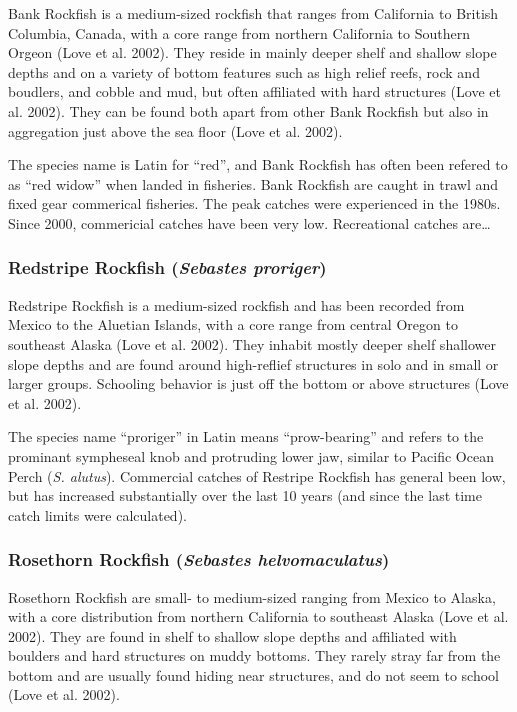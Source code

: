 \documentclass[
  letterpaper,
]{article}
\begin{document}
Bank Rockfish is a medium-sized rockfish that ranges from California to
British Columbia, Canada, with a core range from northern California to
Southern Orgeon (Love et al. 2002). They reside in mainly deeper shelf
and shallow slope depths and on a variety of bottom features such as
high relief reefs, rock and boudlers, and cobble and mud, but often
affiliated with hard structures (Love et al. 2002). They can be found
both apart from other Bank Rockfish but also in aggregation just above
the sea floor (Love et al. 2002).

The species name is Latin for ``red'', and Bank Rockfish has often been
refered to as ``red widow'' when landed in fisheries. Bank Rockfish are
caught in trawl and fixed gear commerical fisheries. The peak catches
were experienced in the 1980s. Since 2000, commericial catches have been
very low. Recreational catches are\ldots{}

\subsubsection{\texorpdfstring{Redstripe Rockfish (\emph{Sebastes
proriger})}{Redstripe Rockfish (Sebastes proriger)}}\label{redstripe-rockfish-sebastes-proriger}

Redstripe Rockfish is a medium-sized rockfish and has been recorded from
Mexico to the Aluetian Islands, with a core range from central Oregon to
southeast Alaska (Love et al. 2002). They inhabit mostly deeper shelf
shallower slope depths and are found around high-reflief structures in
solo and in small or larger groups. Schooling behavior is just off the
bottom or above structures (Love et al. 2002).

The species name ``proriger'' in Latin means ``prow-bearing'' and refers
to the prominant sympheseal knob and protruding lower jaw, similar to
Pacific Ocean Perch (\emph{S. alutus}). Commercial catches of Restripe
Rockfish has general been low, but has increased substantially over the
last 10 years (and since the last time catch limits were calculated).

\subsubsection{\texorpdfstring{Rosethorn Rockfish (\emph{Sebastes
helvomaculatus})}{Rosethorn Rockfish (Sebastes helvomaculatus)}}\label{rosethorn-rockfish-sebastes-helvomaculatus}

Rosethorn Rockfish are small- to medium-sized ranging from Mexico to
Alaska, with a core distribution from northern California to southeast
Alaska (Love et al. 2002). They are found in shelf to shallow slope
depths and affiliated with boulders and hard structures on muddy
bottoms. They rarely stray far from the bottom and are usually found
hiding near structures, and do not seem to school (Love et al. 2002).
\end{document}

